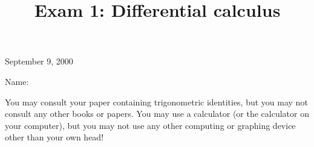 \documentclass[10pt]{amsart}
\title[\hskip 0.2inExam 1\hfill Name:\hskip 2in]{Exam 1:  Differential calculus}
\begin{document}
\begin{figure}[h]
\centerline{
}
\end{figure}

\centerline{\Large{}}
\medskip

\maketitle

\vfill


\centerline{\LARGE{September 9, 2000}}

\vskip 1in

\hskip 2in\Large{Name:}

\vskip 1in

\noindent You may consult your paper containing trigonometric
identities, but you may not consult any other books or papers.  You
may use a calculator (or the calculator on your computer), but you may
not use any other computing or graphing device other than your own
head! 
\end{document}

